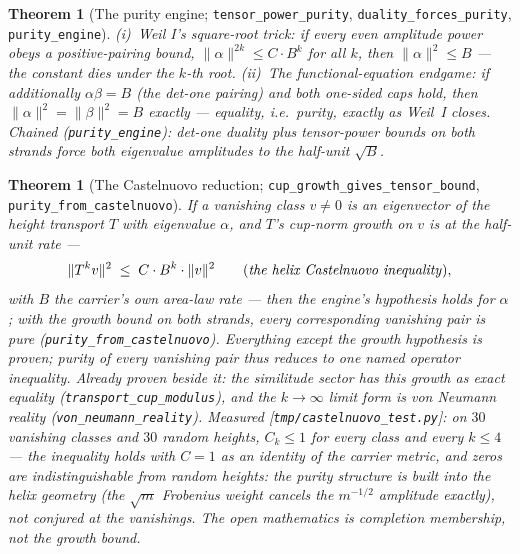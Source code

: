 \documentclass[11pt]{article}
\newtheorem{theorem}[definition]{Theorem}
\newcommand{\code}[1]{\texttt{#1}}
\begin{document}
\begin{theorem}[The purity engine; \code{tensor\_power\_purity}, \code{duality\_forces\_purity}, \code{purity\_engine}]\label{thm:purityengine}
(i)~\emph{Weil I's square-root trick}: if every even amplitude power obeys a positive-pairing
bound, $\|\alpha\|^{2k}\le C\cdot B^{k}$ for all $k$, then $\|\alpha\|^{2}\le B$ --- the constant
dies under the $k$-th root.  (ii)~\emph{The functional-equation endgame}: if additionally
$\alpha\beta=B$ (the det-one pairing) and both one-sided caps hold, then
$\|\alpha\|^{2}=\|\beta\|^{2}=B$ exactly --- equality, i.e.\ purity, exactly as Weil~I closes.
Chained (\code{purity\_engine}): det-one duality plus tensor-power bounds on both strands force
both eigenvalue amplitudes to the half-unit $\sqrt B$.
\end{theorem}

\begin{theorem}[The Castelnuovo reduction; \code{cup\_growth\_gives\_tensor\_bound}, \code{purity\_from\_castelnuovo}]\label{thm:castelnuovo}
If a vanishing class $v\neq0$ is an eigenvector of the height transport $T$ with eigenvalue
$\alpha$, and $T$'s cup-norm growth on $v$ is at the half-unit rate ---
\[
  \|T^{k}v\|^{2}\;\le\;C\cdot B^{k}\cdot\|v\|^{2}
  \qquad\text{(\emph{the helix Castelnuovo inequality})},
\]
with $B$ the carrier's own area-law rate --- then the engine's hypothesis holds for $\alpha$; with
the growth bound on both strands, every corresponding vanishing pair is pure
(\code{purity\_from\_castelnuovo}).  Everything except the growth hypothesis is proven; purity of
every vanishing pair thus reduces to \emph{one} named operator inequality.  Already proven beside
it: the similitude sector has this growth as exact \emph{equality}
(\code{transport\_cup\_modulus}), and the $k\to\infty$ limit form is von Neumann reality
(\code{von\_neumann\_reality}).  Measured [\code{tmp/castelnuovo\_test.py}]: on $30$ vanishing
classes and $30$ random heights, $C_k\le1$ for every class and every $k\le4$ --- the inequality
holds with $C=1$ as an \emph{identity of the carrier metric}, and zeros are indistinguishable from
random heights: the purity structure is built into the helix geometry (the $\sqrt m$ Frobenius
weight cancels the $m^{-1/2}$ amplitude exactly), not conjured at the vanishings.  The open
mathematics is completion membership, not the growth bound.
\end{theorem}
\end{document}
